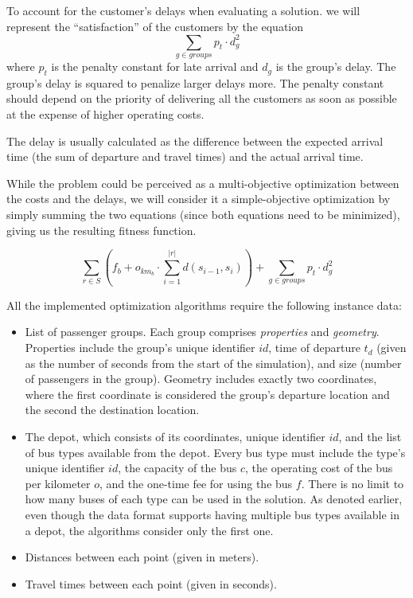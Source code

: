 To account for the customer's delays when evaluating a solution. we will represent the ``satisfaction'' of the customers by the equation
\begin{equation}\label{eq:fitness_satisfaction}
     \sum_{g \in groups} p_t \cdot d_g^2
\end{equation}
where $p_t$ is the penalty constant for late arrival and $d_g$ is the group's delay. The group's delay is squared to penalize larger delays more. The penalty constant should depend on the priority of delivering all the customers as soon as possible at the expense of higher operating costs.

The delay is usually calculated as the difference between the expected arrival time (the sum of departure and travel times) and the actual arrival time.

While the problem could be perceived as a multi-objective optimization between the costs and the delays, we will consider it a simple-objective optimization by simply summing the two equations (since both equations need to be minimized), giving us the resulting fitness function.

\begin{equation}\label{eq:fitness}
    \sum_{r \in S} ( f_b + o_{km_b} \cdot \sum_{i=1}^{|r|}d(s_{i-1},s_{i})) + \sum_{g \in groups} p_t \cdot d_g^2
\end{equation}


All the implemented optimization algorithms require the following instance data:
\begin{itemize}
    \item List of passenger groups. Each group comprises \textit{properties} and \textit{geometry}. Properties include the group's unique identifier $id$, time of departure $t_d$ (given as the number of seconds from the start of the simulation), and size (number of passengers in the group). Geometry includes exactly two coordinates, where the first coordinate is considered the group's departure location and the second the destination location.
    \item The depot, which consists of its coordinates, unique identifier $id$, and the list of bus types available from the depot. Every bus type must include the type's unique identifier $id$, the capacity of the bus $c$, the operating cost of the bus per kilometer $o$, and the one-time fee for using the bus $f$. There is no limit to how many buses of each type can be used in the solution. As denoted earlier, even though the data format supports having multiple bus types available in a depot, the algorithms consider only the first one.
    \item Distances between each point (given in meters).
    \item Travel times between each point (given in seconds).
\end{itemize}

